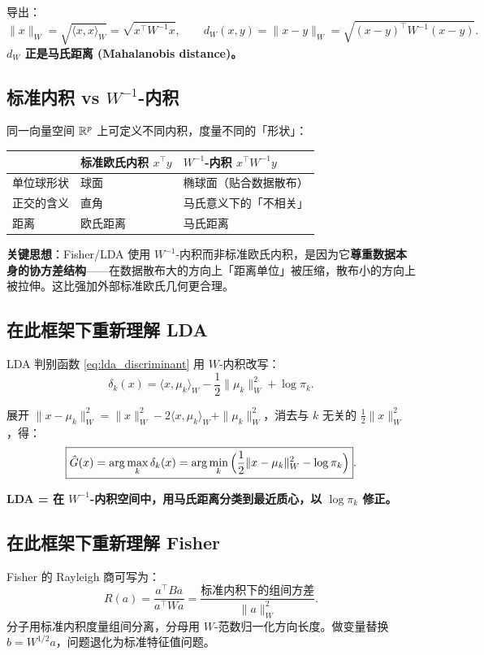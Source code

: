 导出：
\[
\|x\|_W = \sqrt{\langle x, x \rangle_W} = \sqrt{x^\top W^{-1} x}, \qquad
d_W(x, y) = \|x - y\|_W = \sqrt{(x-y)^\top W^{-1} (x-y)}.
\]
\textbf{$d_W$ 正是马氏距离 (Mahalanobis distance)。}

\subsection{标准内积 vs $W^{-1}$-内积}

同一向量空间 $\mathbb{R}^p$ 上可定义不同内积，度量不同的「形状」：

\begin{center}
\begin{tabular}{lll}
\toprule
& 标准欧氏内积 $x^\top y$ & $W^{-1}$-内积 $x^\top W^{-1} y$ \\
\midrule
单位球形状 & 球面 & 椭球面（贴合数据散布） \\
正交的含义 & 直角 & 马氏意义下的「不相关」 \\
距离 & 欧氏距离 & 马氏距离 \\
\bottomrule
\end{tabular}
\end{center}

\textbf{关键思想}：Fisher/LDA 使用 $W^{-1}$-内积而非标准欧氏内积，是因为它\textbf{尊重数据本身的协方差结构}——在数据散布大的方向上「距离单位」被压缩，散布小的方向上被拉伸。这比强加外部标准欧氏几何更合理。

\subsection{在此框架下重新理解 LDA}

LDA 判别函数 \eqref{eq:lda_discriminant} 用 $W$-内积改写：
\[
\delta_k(x) = \langle x, \mu_k \rangle_W - \frac12 \|\mu_k\|_W^2 + \log \pi_k.
\]

展开 $\|x - \mu_k\|_W^2 = \|x\|_W^2 - 2\langle x, \mu_k\rangle_W + \|\mu_k\|_W^2$，消去与 $k$ 无关的 $\frac12\|x\|_W^2$，得：
\[
\boxed{\hat{G}(x) = \arg\max_k \delta_k(x) = \arg\min_k \Big( \frac12 \|x - \mu_k\|_W^2 - \log \pi_k \Big)}.
\]

\textbf{LDA = 在 $W^{-1}$-内积空间中，用马氏距离分类到最近质心，以 $\log\pi_k$ 修正。}

\subsection{在此框架下重新理解 Fisher}

Fisher 的 Rayleigh 商可写为：
\[
R(a) = \frac{a^\top B a}{a^\top W a}
     = \frac{\text{标准内积下的组间方差}}{\|a\|_W^2}.
\]
分子用标准内积度量组间分离，分母用 $W$-范数归一化方向长度。做变量替换 $b = W^{1/2} a$，问题退化为标准特征值问题。

